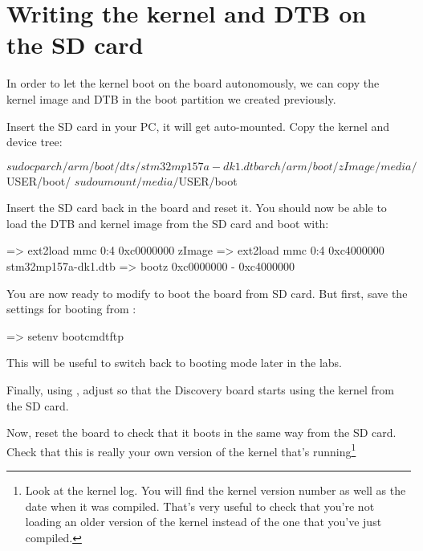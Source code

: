 \section{Writing the kernel and DTB on the SD card}

In order to let the kernel boot on the board autonomously, we can
copy the kernel image and DTB in the boot partition we created
previously.

Insert the SD card in your PC, it will get auto-mounted. Copy the
kernel and device tree:

\begin{bashinput}
$ sudo cp arch/arm/boot/dts/stm32mp157a-dk1.dtb arch/arm/boot/zImage /media/$USER/boot/
$ sudo umount /media/$USER/boot
\end{bashinput}
\normalsize

Insert the SD card back in the board and reset it. You should now be
able to load the DTB and kernel image from the SD card and boot with:

\begin{ubootinput}
=> ext2load mmc 0:4 0xc0000000 zImage
=> ext2load mmc 0:4 0xc4000000 stm32mp157a-dk1.dtb
=> bootz 0xc0000000 - 0xc4000000
\end{ubootinput}

You are now ready to modify  to boot the board
from SD card. But first, save the settings for booting from
:

\begin{ubootinput}
=> setenv bootcmdtftp %
\end{ubootinput}

This will be useful to switch back to  booting mode
later in the labs.

Finally, using , adjust  so that
the Discovery board starts using the kernel from the SD card.

Now, reset the board to check that it boots in the same way from the
SD card. Check that this is really your own version of the kernel
that's running\footnote{Look at the kernel log. You will find the
kernel version number as well as the date when it was compiled.
That's very useful to check that you're not loading an older version
of the kernel instead of the one that you've just compiled.}

